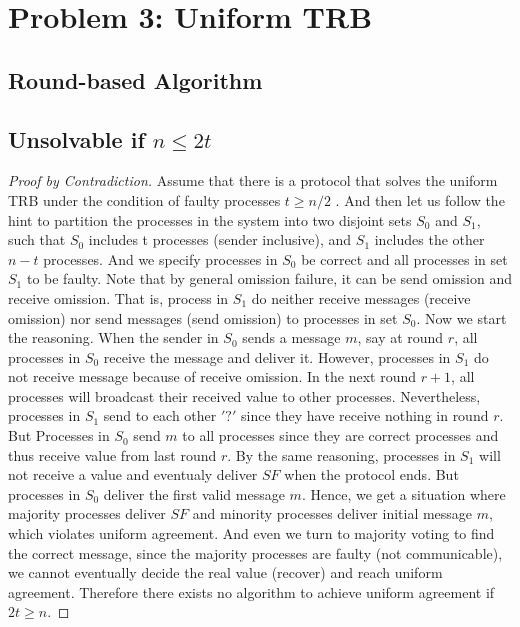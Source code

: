 \documentclass[11pt,a4paper]{article}
\begin{document}
\section{Problem 3: Uniform TRB}
\subsection{Round-based Algorithm}



\subsection{Unsolvable if $n \leq 2t$}
\begin{proof}[Proof by Contradiction]
Assume that there is a protocol that solves the uniform TRB under the
condition of faulty processes $t \geq n/2$ . 
And then let us follow the hint to partition the processes in the system into two
disjoint sets $S_0$ and $S_1$, such that $S_0$ includes t 
processes (sender inclusive), and $S_1$ includes the other $n-t$ processes.
And we specify processes in $S_0$ be correct and all processes in set $S_1$ to be faulty.
Note that by general omission failure, it can be send omission and receive
omission. That is, process in $S_1$ do neither receive messages (receive omission)
nor send messages (send omission) to processes in set $S_0$. 
Now we start the reasoning. When the sender in $S_0$ sends a message $m$, say
at round $r$, all
processes in $S_0$ receive the message and deliver it. However, processes in $S_1$
do not receive message because of receive omission. In the next round $r+1$, all 
processes will broadcast their received value to other processes.
Nevertheless, processes in $S_1$ send to each other $'?'$ since they have
receive nothing in round $r$. But Processes in $S_0$ send $m$ to all processes
since they are correct processes and thus receive value from last round $r$. 
By the same reasoning, processes in $S_1$ will not receive
a value and eventualy deliver $SF$ when the protocol ends.
But processes in $S_0$ deliver the first valid message $m$.
Hence, we get a situation where majority processes deliver $SF$ and minority
processes deliver initial message $m$, which violates uniform agreement.
And even we turn to majority voting to find the correct message, since the
majority processes are faulty (not communicable), we cannot eventually decide
the real value (recover) and reach uniform agreement.
Therefore there exists no algorithm to achieve uniform agreement if $2t \geq
n$.

\end{proof}
\end{document}
